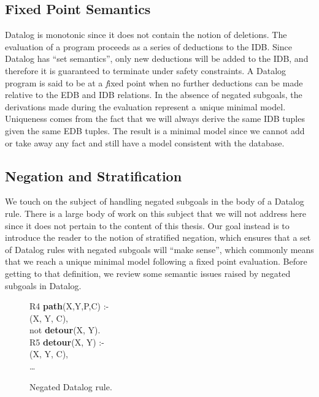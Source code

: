 \subsection{Fixed Point Semantics}

Datalog is monotonic since it does not contain the notion of deletions.  The
evaluation of a program proceeds as a series of deductions to the IDB.  Since
Datalog has ``set semantics'', only new deductions will be added to the IDB,
and therefore it is guaranteed to terminate under safety constraints.  A
Datalog program is said to be at a {\emph fixed point} when no further
deductions can be made relative to the EDB and IDB relations.  In the absence
of negated subgoals, the derivations made during the evaluation represent a
{\emph unique minimal model}.  Uniqueness comes from the fact that we will
always derive the same IDB tuples given the same EDB tuples.  The result is a
minimal model since we cannot add or take away any fact and still have a model
consistent with the database.

\subsection{Negation and Stratification}

We touch on the subject of handling negated subgoals in the body of a Datalog
rule.  There is a large body of work on this subject that we will not address
here since it does not pertain to the content of this thesis.  Our goal instead
is to introduce the reader to the notion of stratified negation, which ensures
that a set of Datalog rules with negated subgoals will ``make sense'', which
commonly means that we reach a unique minimal model following a fixed point
evaluation.  Before getting to that definition, we review some semantic issues
raised by negated subgoals in Datalog.

\begin{figure}
\centering
\ssp
\begin{boxedminipage}{\linewidth}
R4 {\bf path}(X,Y,P,C) :- \\
(X, Y, C), \\
\datalogspace not {\bf detour}(X, Y). \\

R5 {\bf detour}(X, Y) :- \\
(X, Y, C), \\
\datalogspace \ldots 
\end{boxedminipage}
\caption{\label{ch:p2:fig:negation}Negated Datalog rule.}
\end{figure}

